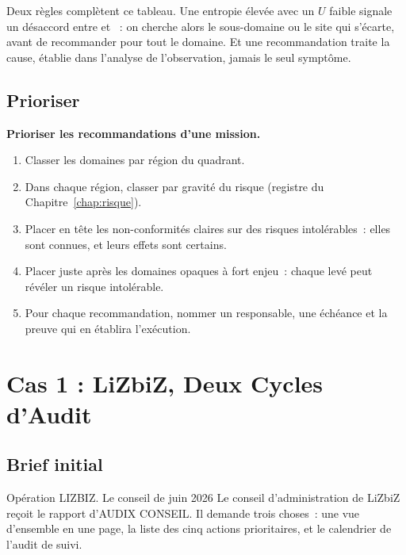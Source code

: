 Deux règles complètent ce tableau. Une entropie élevée avec un $U$ faible
signale un désaccord entre \OUI{} et \NON{}~: on cherche alors le
sous-domaine ou le site qui s'écarte, avant de recommander pour tout le
domaine. Et une recommandation traite la cause, établie dans l'analyse de
l'observation, jamais le seul symptôme.

\subsection{Prioriser}

\begin{boxprocedure}
\textbf{Prioriser les recommandations d'une mission.}
\begin{enumerate}
    \item Classer les domaines par région du quadrant.
    \item Dans chaque région, classer par gravité du risque (registre du
          Chapitre~\ref{chap:risque}).
    \item Placer en tête les non-conformités claires sur des risques
          intolérables~: elles sont connues, et leurs effets sont
          certains.
    \item Placer juste après les domaines opaques à fort enjeu~: chaque
          \NEK{} levé peut révéler un risque intolérable.
    \item Pour chaque recommandation, nommer un responsable, une échéance
          et la preuve qui en établira l'exécution.
\end{enumerate}
\end{boxprocedure}

\section{Cas 1 : LiZbiZ, Deux Cycles d'Audit}
\label{sec:c26-lizbiz}

\subsection{Brief initial}

\begin{boxscenario}{Opération LIZBIZ. Le conseil de juin 2026}
Le conseil d'administration de LiZbiZ reçoit le rapport d'AUDIX CONSEIL. Il
demande trois choses~: une vue d'ensemble en une page, la liste des cinq
actions prioritaires, et le calendrier de l'audit de suivi.
\end{boxscenario}

